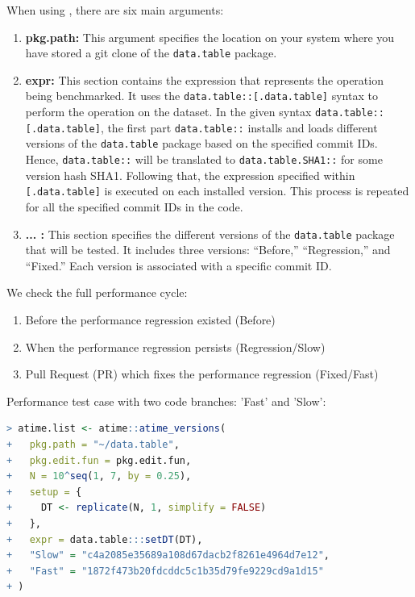 When using , there are six main arguments:

\begin{enumerate}
    \item \textbf{pkg.path:} This argument specifies the location on your system where you have stored a git clone of the \texttt{data.table} package.
       
    \item \textbf{expr:} This section contains the expression that represents the operation being benchmarked. It uses the \texttt{data.table::[.data.table]} syntax to perform the operation on the dataset. In the given syntax \texttt{data.table::[.data.table]}, the first part \texttt{data.table::} installs and loads different versions of the \texttt{data.table} package based on the specified commit IDs. Hence, \texttt{data.table::} will be translated to \texttt{data.table.SHA1::} for some version hash SHA1. Following that, the expression specified within \texttt{[.data.table]} is executed on each installed version. This process is repeated for all the specified commit IDs in the code.
 
    \item \textbf{... :} This section specifies the different versions of the \texttt{data.table} package that will be tested. It includes three versions: ``Before,'' ``Regression,'' and ``Fixed.'' Each version is associated with a specific commit ID.
\end{enumerate}

We check the full performance cycle:

\begin{enumerate}
    \item Before the performance regression existed (Before)
    \item When the performance regression persists (Regression/Slow)
    \item Pull Request (PR) which fixes the performance regression (Fixed/Fast)
\end{enumerate}


\noindent Performance test case with two code branches: 'Fast' and 'Slow':\\

\begin{lstlisting}[language=R]
> atime.list <- atime::atime_versions(
+   pkg.path = "~/data.table",
+   pkg.edit.fun = pkg.edit.fun,
+   N = 10^seq(1, 7, by = 0.25),
+   setup = { 
+     DT <- replicate(N, 1, simplify = FALSE)
+   },
+   expr = data.table:::setDT(DT),
+   "Slow" = "c4a2085e35689a108d67dacb2f8261e4964d7e12",
+   "Fast" = "1872f473b20fdcddc5c1b35d79fe9229cd9a1d15"
+ )
\end{lstlisting}

